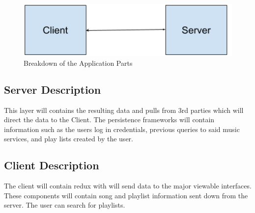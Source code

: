 \begin{figure}[h!]
	\centering
 	\includegraphics[width=1\textwidth]{images/ADS-SDS-System.png}
 	\caption{Breakdown of the Application Parts}
\end{figure}

\subsection{Server Description}
This layer will contains the resulting data and pulls from 3rd parties which will direct the data to the Client. The persistence frameworks will contain information such as the users log in credentials, previous queries to said music services, and play lists created by the user.

\subsection{Client Description}
The client will contain redux with will send data to the major viewable interfaces. These components will contain song and playlist information sent down from the server. The user can search for playlists.